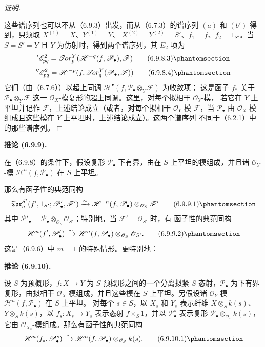 \documentclass[UTF8,fontset=none,11pt,oneside,openany]{ctexbook}
\providecommand{\square}{\mdlgwhtsquare}
\newenvironment{corollary}[1][]{%
  \par\medskip\noindent\textbf{推论 (#1).}\ %
}{\par}
\newenvironment{proof}{%
  \par\smallskip\noindent\textit{证明.}\ %
}{\hfill$\square$\par}
\newcommand{\oldpage}[2][]{%
  \hypertarget{ega-source-page-#1-#2}{}%
  \marginnote{\scriptsize\textbf{#1}~|~#2}\ignorespaces}
\let\EGAOriginalLabel\label
\renewcommand{\label}[1]{\phantomsection\EGAOriginalLabel{#1}}
\begin{document}
\begin{proof}
这些谱序列也可以不从（6.9.3）出发，而从（6.7.3）的谱序列 $(a)$ 和
$(b')$ 得到，只须取 $X^{(1)}=X$、$Y^{(1)}=Y$、
$X^{(2)}=Y^{(2)}=S'$、$f_1=f$、$f_2=1_{S'}$。当
$S=S'=Y$ 且 $Y$ 为仿射时，得到两个谱序列，其 $E_2$ 项为
\[
  {}'\mathscr E_{pq}^2
  =\mathscr{T}\!or_p^Y
  (\mathscr H^{-q}(f,\mathscr P_\bullet),\mathscr F)
  \tag{6.9.8.3}\label{III.6.9.8.3.fr}
\]
\[
  {}''\mathscr E_{pq}^2
  =\mathscr H^{-p}
  (f,\mathscr{T}\!or_q^Y(\mathscr P_\bullet,\mathscr F))
  \tag{6.9.8.4}\label{III.6.9.8.4.fr}
\]
它们（由（6.7.6））以超上同调
$\mathscr H^\bullet(f,\mathscr P_\bullet\otimes_Y\mathscr F)$ 为收敛项；
这是函子 $f_*$ 关于 $\mathscr P_\bullet\otimes_Y\mathscr F$ 这一
$\mathscr O_X$-模复形的超上同调。这里，对每个拟相干 $\mathscr O_Y$-模，
若它在 $Y$ 上平坦并记作 $\mathscr F$，上述结论成立（或者，对每个拟相干
$\mathscr O_Y$-模 $\mathscr F$，当 $\mathscr P_\bullet$ 由
$\mathscr O_X$-模组成且这些模在 $Y$ 上平坦时，上述结论成立）。这两个谱序列
不同于（6.2.1）中的那些谱序列。
\end{proof}

\begin{corollary}[6.9.9]
在（6.9.8）的条件下，假设复形
$\mathscr P_\bullet$ 下有界，由在
$S$ 上平坦的模组成，并且诸 $\mathscr O_Y$-模
$\mathscr H^n(f,\mathscr P_\bullet)$ 在 $S$ 上平坦。

\oldpage[III]{171}
那么有函子性的典范同构
\[
  \mathfrak{Tor}_n^{S'}
  (f',1_{S'};\mathscr P'_\bullet,\mathscr F')
  \xrightarrow{\sim}
  \mathscr H^{-n}(f,\mathscr P_\bullet)
  \otimes_{\mathscr O_S}\mathscr F'
  \tag{6.9.9.1}\label{III.6.9.9.1.fr}
\]
其中
$\mathscr P'_\bullet=\mathscr P_\bullet\otimes_{\mathscr O_S}
\mathscr O_{S'}$；特别地，当 $\mathscr F'=\mathscr O_{S'}$ 时，有
函子性的典范同构
\[
  \mathscr H^n(f',\mathscr P'_\bullet)
  \xrightarrow{\sim}
  \mathscr H^n(f,\mathscr P_\bullet)
  \otimes_{\mathscr O_S}\mathscr O_{S'}.
  \tag{6.9.9.2}\label{III.6.9.9.2.fr}
\]
这是（6.9.6）中 $m=1$ 的特殊情形。更特别地：
\end{corollary}

\begin{corollary}[6.9.10]
设 $S$ 为预概形，$f:X\to Y$ 为 $S$-预概形之间的一个分离拟紧
$S$-态射，$\mathscr P_\bullet$ 为下有界复形，由拟相干
$\mathscr O_X$-模组成，并且这些模在 $S$ 上平坦。另假设诸
$\mathscr O_Y$-模 $\mathscr H^n(f,\mathscr P_\bullet)$ 在 $S$ 上平坦。
对每个 $s\in S$，以 $X_s$ 和 $Y_s$ 表示纤维
$X\otimes_S k(s)$、$Y\otimes_S k(s)$，以
$f_s:X_s\to Y_s$ 表示态射 $f\times_S1$，并以
$\mathscr P_\bullet^s$ 表示复形
$\mathscr P_\bullet\otimes_{\mathscr O_S}k(s)$，它由
$\mathscr O_{X_s}$-模组成。那么有函子性的典范同构
\[
  \mathscr H^n(f_s,\mathscr P_\bullet^s)
  \xrightarrow{\sim}
  \mathscr H^n(f,\mathscr P_\bullet)\otimes_{\mathscr O_S}k(s).
  \tag{6.9.10.1}\label{III.6.9.10.1.fr}
\]
\end{corollary}
\end{document}
